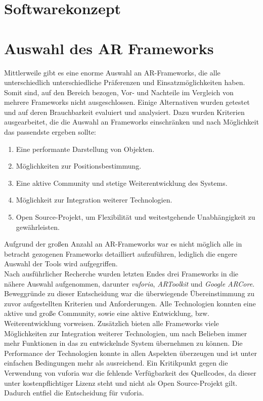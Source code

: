 \section{Softwarekonzept}
\label{chap:Softwarekonzept}

\section{Auswahl des AR Frameworks}
\label{chap:Auswahl des AR Frameworks}
Mittlerweile gibt es eine enorme Auswahl an \acs{AR}-Frameworks, die alle unterschiedlich unterschiedliche Präferenzen und 
Einsatzmöglichkeiten haben. Somit sind, auf den Bereich bezogen, Vor- und Nachteile im Vergleich von mehrere Frameworks nicht ausgeschlossen. 
Einige Alternativen wurden getestet und auf deren Brauchbarkeit evaluiert und analysiert. Dazu wurden Kriterien ausgearbeitet, die die 
Auswahl an Frameworks einschränken und nach Möglichkeit das passendste ergeben sollte: 
\begin{enumerate}
    \item Eine performante Darstellung von Objekten.
    \item Möglichkeiten zur Positionsbestimmung.
    \item Eine aktive Community und stetige Weiterentwicklung des Systems.
    \item Möglichkeit zur Integration weiterer Technologien.
    \item Open Source-Projekt, um Flexibilität und weitestgehende Unabhängigkeit zu gewährleisten.
\end{enumerate}
Aufgrund der großen Anzahl an \acs{AR}-Frameworks war es nicht möglich alle in betracht gezogenen Frameworks detailliert aufzuführen, 
lediglich die engere Auswahl der Tools wird aufgegriffen. 
\\ 
Nach ausführlicher Recherche wurden letzten Endes drei Frameworks in die nähere Auswahl aufgenommen, darunter \textit{vuforia}, 
\textit{ARToolkit} und \textit{Google ARCore}. Beweggründe zu dieser Entscheidung war die überwiegende 
Übereinstimmung zu zuvor aufgestellten Kriterien und Anforderungen. Alle Technologien konnten eine aktive und große Community, sowie eine 
aktive Entwicklung, bzw. Weiterentwicklung vorweisen. Zusätzlich bieten alle Frameworks viele Möglichkeiten zur Integration weiterer 
Technologien, um nach Belieben immer mehr Funktionen in das zu entwickelnde System übernehmen zu können. Die Performance der Technologien konnte 
in allen Aspekten überzeugen und ist unter einfachen Bedingungen mehr als ausreichend. Ein Kritikpunkt gegen die Verwendung von vuforia war 
die fehlende Verfügbarkeit des Quellcodes, da dieser unter kostenpflichtiger Lizenz steht und nicht als Open Source-Projekt gilt. Dadurch 
entfiel die Entscheidung für vuforia.

